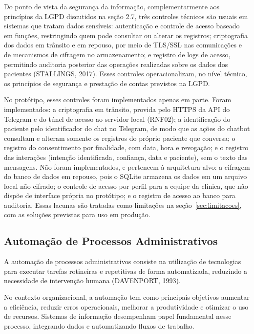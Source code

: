 \documentclass[12pt,a4paper]{extarticle}
\begin{document}
Do ponto de vista da segurança da informação, complementarmente aos princípios da LGPD discutidos na seção 2.7, três controles técnicos são usuais em sistemas que tratam dados sensíveis: autenticação e controle de acesso baseado em funções, restringindo quem pode consultar ou alterar os registros; criptografia dos dados em trânsito e em repouso, por meio de TLS/SSL nas comunicações e de mecanismos de cifragem no armazenamento; e registro de logs de acesso, permitindo auditoria posterior das operações realizadas sobre os dados dos pacientes (STALLINGS, 2017). Esses controles operacionalizam, no nível técnico, os princípios de segurança e prestação de contas previstos na LGPD.

No protótipo, esses controles foram implementados apenas em parte. Foram implementados: a criptografia em trânsito, provida pelo HTTPS da API do Telegram e do túnel de acesso ao servidor local (RNF02); a identificação do paciente pelo identificador do chat no Telegram, de modo que as ações do chatbot consultam e alteram somente os registros do próprio paciente que conversa; o registro do consentimento por finalidade, com data, hora e revogação; e o registro das interações (intenção identificada, confiança, data e paciente), sem o texto das mensagens. Não foram implementados, e pertencem à arquitetura-alvo: a cifragem do banco de dados em repouso, pois o SQLite armazena os dados em um arquivo local não cifrado; o controle de acesso por perfil para a equipe da clínica, que não dispõe de interface própria no protótipo; e o registro de acesso ao banco para auditoria. Essas lacunas são tratadas como limitações na seção~\ref{sec:limitacoes}, com as soluções previstas para uso em produção.

\subsection{Automação de Processos Administrativos}

A automação de processos administrativos consiste na utilização de tecnologias para executar tarefas rotineiras e repetitivas de forma automatizada, reduzindo a necessidade de intervenção humana (DAVENPORT, 1993).

No contexto organizacional, a automação tem como principais objetivos aumentar a eficiência, reduzir erros operacionais, melhorar a produtividade e otimizar o uso de recursos. Sistemas de informação desempenham papel fundamental nesse processo, integrando dados e automatizando fluxos de trabalho.
\end{document}

